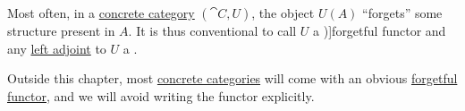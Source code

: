 \begin{concept}\label{con:forgetful_functor}
  Most often, in a \hyperref[def:concrete_category]{concrete category} \( (\cat{C}, U) \), the object \( U(A) \) \enquote{forgets} some structure present in \( A \). It is thus conventional to call \( U \) a \term[ru=пренебрегающий функтор (\cite[180]{ЦаленкоШульгейфер1974ОсновыТеорииКатегорий})]{forgetful functor} and any \hyperref[def:adjoint_functor]{left adjoint} to \( U \) a .
\end{concept}

\begin{remark}\label{rem:concrete_category_notation}
  Outside this chapter, most \hyperref[def:concrete_category]{concrete categories} will come with an obvious \hyperref[con:forgetful_functor]{forgetful functor}, and we will avoid writing the functor explicitly.
\end{remark}

